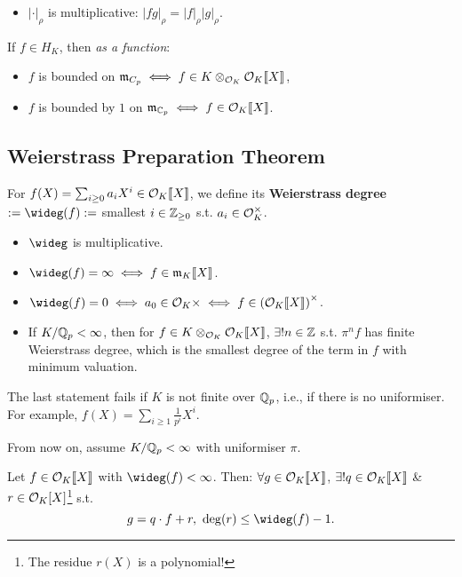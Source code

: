\begin{itemize}
    \item $|\cdot|_\rho$ is multiplicative: $|fg|_{\rho} = |f|_\rho|g|_\rho$.
\end{itemize}

\begin{example}
    If $f\in H_K$, then \textit{as a function}:\begin{itemize}
        \item $f$ is bounded on $\mathfrak{m}_{C_p}\iff f\in K\otimes_{\mathcal{O}_K}\mathcal{O}_K\llbracket X \rrbracket$,
        \item $f$ is bounded by $1$ on $\mathfrak{m}_{\mathbb{C}_p}\iff f\in\mathcal{O}_K\llbracket X \rrbracket$.
    \end{itemize}
\end{example}

\subsection{Weierstrass Preparation Theorem}
For $f(X) = \sum_{i\ge 0}a_iX^i\in\mathcal{O}_K\llbracket X \rrbracket$, we define its \textbf{Weierstrass degree} $:= \wideg(f) :=$ smallest $i\in\mathbb{Z}_{\ge 0}$ s.t. $a_i\in\mathcal{O}_K^\times$.
\begin{itemize}
    \item $\wideg$ is multiplicative.
    \item $\wideg(f) = \infty\iff f\in\m_{K}\llbracket X \rrbracket$.
    \item $\wideg(f) = 0\iff a_0\in\O_K\times\iff f\in\left( \O_K\llbracket X \rrbracket \right)^\times$.
    \item If $K/\mathbb{Q}_p < \infty$, then for $f\in K\otimes_{\mathcal{O}_K}\mathcal{O}_K\llbracket X \rrbracket$,
    $\exists ! n\in\mathbb{Z}$ s.t. $\pi^n f$ has finite Weierstrass degree, which is the smallest degree of the term in $f$ with minimum valuation.
\end{itemize}
\begin{remark}
    The last statement fails if $K$ is not finite over $\mathbb{Q}_p$, i.e., if there is no uniformiser. For example, $f(X) = \sum_{i\ge 1}\frac{1}{p^i}X^i$.
\end{remark}
From now on, assume $K/\mathbb{Q}_p < \infty$ with uniformiser $\pi$.
\begin{proposition}
    \label{Euclidean division for power series}
    Let $f\in\mathcal{O}_K\llbracket X \rrbracket$ with $\wideg(f) < \infty$.
    Then: $\forall g\in \mathcal{O}_K\llbracket X \rrbracket$, $\exists ! q\in \mathcal{O}_K\llbracket X \rrbracket$ \& $r\in \mathcal{O}_K[X]$\footnote{The residue $r(X)$ is a polynomial!} s.t. \[g = q\cdot f + r,\ \deg(r)\le \wideg(f) - 1.\]
\end{proposition}
